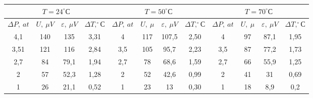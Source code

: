 \begin{tabular}{cccc|cccc|cccc}
	\toprule
	\multicolumn{4}{c|}{$ T=24^\circ С $} & 
	\multicolumn{4}{c|}{$ T=50^\circ С $} & 
	\multicolumn{4}{c}{$ T=70^\circ С $} \\\midrule
	$ \Delta P,~at $   & $ U,~\mu V $ & $ \varepsilon,~\mu V $    & $ \Delta T, ^\circ{С} $   
	& $ \Delta P,~at $   & $ U,~\mu  $ & $ \varepsilon,~\mu V $    & $ \Delta T, ^\circ{С} $ 
	& $ \Delta P,~at $   & $ U,~\mu  $ & $ \varepsilon,~\mu V $    & $ \Delta T, ^\circ{С} $           \\\midrule
	4,1     & 140      & 135  & 3,31   & 4       & 117  & 107,5 & 2,50 & 4       & 97 & 87,1 & 1,95 \\
	3,51    & 121     & 116  & 2,84   & 3,5     & 105 & 95,7  & 2,23 & 3,5     & 87 & 77,2 & 1,73 \\
	2,7     & 84    & 79,1 & 1,94   & 2,7     & 78 & 68,6  & 1,59 & 2,7     & 66 & 55,9 & 1,25 \\
	2       & 57    & 52,3 & 1,28   & 2       & 52 & 42,6  & 0,99 & 2       & 41 & 31  & 0,69 \\
	1       & 26    & 21,1 & 0,52   & 1       & 23 & 13    & 0,30 & 1       & 18 & 8,9  & 0,2  \\
	\bottomrule      
\end{tabular}
